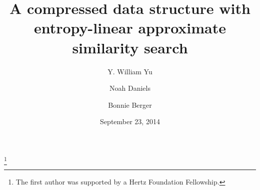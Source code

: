 \documentclass{amsart}
\theoremstyle{definition}
\theoremstyle{remark}
\numberwithin{equation}{section}
\begin{document}
\title{A compressed data structure with entropy-linear approximate similarity search}

\author{Y. William Yu}
\address{Department of Mathematics, Massachusetts Institute of Technology, Cambridge, Massachusetts 02139}
\thanks{The first author was supported by a Hertz Foundation Fellowship.}

\author{Noah Daniels}

\author{Bonnie Berger}


\date{September 23, 2014}


\end{document}
